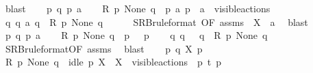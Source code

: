 \begin{isabellebody}
\ blast\isanewline
{}\isamarkupfalse%
\isanewline
\ \ \isamarkupfalse%
\ p\ q\ p{\isacharprime}{\kern0pt}\ a\isanewline
\ \ \isamarkupfalse%
\ {\isacartoucheopen}R\ p\ None\ q{\isacartoucheclose}\ \ {\isacartoucheopen}p\ {\isasymlongmapsto}a\ p{\isacharprime}{\kern0pt}{\isacartoucheclose}\ \ {\isacartoucheopen}a\ {\isasymin}\ visible{\isacharunderscore}{\kern0pt}actions{\isacartoucheclose}\isanewline
\ \ \isamarkupfalse%
\ {\isacartoucheopen}{\isasymexists}q{\isacharprime}{\kern0pt}{\isachardot}{\kern0pt}\ q\ {\isasymlongmapsto}a\ q{\isacharprime}{\kern0pt}\ {\isasymand}\ R\ p{\isacharprime}{\kern0pt}\ None\ q{\isacharprime}{\kern0pt}{\isacartoucheclose}\isanewline
\ \ \ \ \isamarkupfalse%
\ SRB{\isacharunderscore}{\kern0pt}ruleformat{\isacharparenleft}{\kern0pt}{}{\isacharcomma}{\kern0pt}\ {}{\isacharparenright}{\kern0pt}{\isacharbrackleft}{\kern0pt}OF\ assms{\isacharcomma}{\kern0pt}\ \ {\isacharquery}{\kern0pt}X\ {\isacharequal}{\kern0pt}\ {\isacartoucheopen}{\isacharbraceleft}{\kern0pt}a{\isacharbraceright}{\kern0pt}{\isacartoucheclose}{\isacharbrackright}{\kern0pt}\ \isamarkupfalse%
\ blast\isanewline
{}\isamarkupfalse%
\isanewline
\ \ \isamarkupfalse%
\ p\ q\ p{\isacharprime}{\kern0pt}\ a\isanewline
\ \ \isamarkupfalse%
\ {\isacartoucheopen}R\ p\ None\ q{\isacartoucheclose}\ \ {\isacartoucheopen}p\ {\isasymlongmapsto}{\isasymtau}\ \ p{\isacharprime}{\kern0pt}{\isacartoucheclose}\isanewline
\ \ \isamarkupfalse%
\ {\isacartoucheopen}{\isasymexists}q{\isacharprime}{\kern0pt}{\isachardot}{\kern0pt}\ q\ {\isasymlongmapsto}{\isasymtau}\ \ q{\isacharprime}{\kern0pt}\ {\isasymand}\ R\ p{\isacharprime}{\kern0pt}\ None\ q{\isacharprime}{\kern0pt}{\isacartoucheclose}\isanewline
\ \ \ \ \isamarkupfalse%
\ SRB{\isacharunderscore}{\kern0pt}ruleformat{\isacharparenleft}{\kern0pt}{}{\isacharparenright}{\kern0pt}{\isacharbrackleft}{\kern0pt}OF\ assms{\isacharbrackright}{\kern0pt}\ \isamarkupfalse%
\ blast\isanewline
{}\isamarkupfalse%
\isanewline
\ \ \isamarkupfalse%
\ p\ q\ X\ p{\isacharprime}{\kern0pt}\isanewline
\ \ \isamarkupfalse%
\ {\isacartoucheopen}R\ p\ None\ q{\isacartoucheclose}\ \ {\isacartoucheopen}idle\ p\ X{\isacartoucheclose}\ \ {\isacartoucheopen}X\ {\isasymsubseteq}\ visible{\isacharunderscore}{\kern0pt}actions{\isacartoucheclose}\ \ {\isacartoucheopen}p\ {\isasymlongmapsto}t\ p{\isacharprime}{\kern0pt}{\isacartoucheclose}\isanewline

\end{isabellebody}
